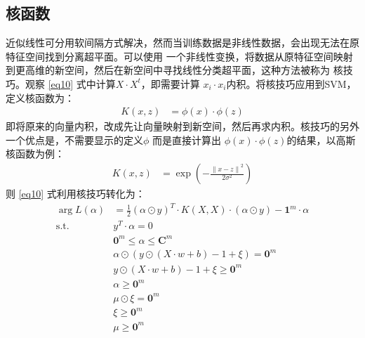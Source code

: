 \documentclass[12pt, a4paper, oneside]{ctexart}
\begin{document}
\subsection{核函数}
近似线性可分用软间隔方式解决，然而当训练数据是非线性数据，会出现无法在原特征空间找到分离超平面。可以使用
一个非线性变换，将数据从原特征空间映射到更高维的新空间，然后在新空间中寻找线性分类超平面，这种方法被称为
核技巧。观察 \eqref{eq10} 式中计算$X \cdot X^t $，即需要计算 $x_i \cdot x_i$内积。将核技巧应用到SVM，
定义核函数为：
\begin{align*}
K(x, z) &=  \phi(x) \cdot \phi(z)
\end{align*}
即将原来的向量内积，改成先让向量映射到新空间，然后再求内积。核技巧的另外一个优点是，不需要显示的定义$\phi$
而是直接计算出 $\phi(x) \cdot \phi(z)$的结果，以高斯核函数为例：
\begin{align*}
    K(x, z) &=  \exp ( -\frac{\left\|x-z\right\|^2}{2\sigma^2 }) 
\end{align*}
则 \eqref{eq10} 式利用核技巧转化为：
\begin{align}
    \mathop{\arg\min_{\alpha}}  L({\alpha}) &= \frac{1}{2}(\alpha \odot y)^T \cdot K(X, X) \cdot (\alpha \odot y) - \boldsymbol{1}^m \cdot \alpha \label{eq11}\\
    \mathrm{ s.t. }\ \   &y^T \cdot \alpha = 0 \nonumber \\
    & \boldsymbol{0}^m \leq \alpha \leq \boldsymbol{C}^m \nonumber \\
    &{\alpha} \odot  (y \odot (X \cdot w + b) - 1 + \xi) = \boldsymbol{0}^m \nonumber \\
    &y \odot (X \cdot w + b) - 1  + \xi \geq \boldsymbol{0}^m \nonumber \\
    &{\alpha} \geq \boldsymbol{0}^m  \nonumber \\
    &\mu \odot \xi =  \boldsymbol{0}^m \nonumber \\
    &\xi \geq \boldsymbol{0}^m  \nonumber \\
    &\mu \geq \boldsymbol{0}^m  \nonumber 
\end{align}
\end{document}
